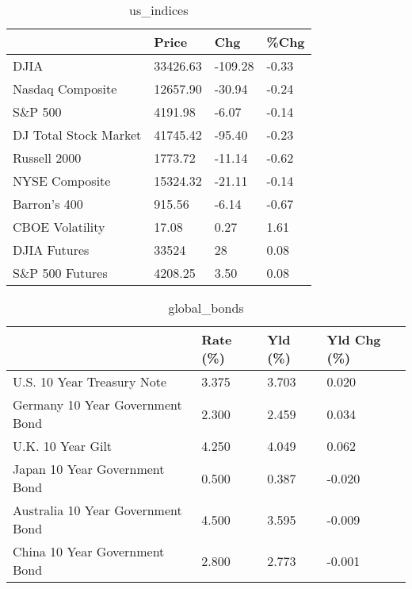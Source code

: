 \documentclass{article}%
\begin{document}
%


\begin{table}[htbp]%
\caption{us\_indices}%
\centering%
\begin{adjustbox}{width=1\textwidth}%
\begin{tabular}{llll}
\toprule
                      &    Price &     Chg &  \%Chg \\
\midrule
                 DJIA & 33426.63 & -109.28 & -0.33 \\
     Nasdaq Composite & 12657.90 &  -30.94 & -0.24 \\
              S\&P 500 &  4191.98 &   -6.07 & -0.14 \\
DJ Total Stock Market & 41745.42 &  -95.40 & -0.23 \\
         Russell 2000 &  1773.72 &  -11.14 & -0.62 \\
       NYSE Composite & 15324.32 &  -21.11 & -0.14 \\
         Barron's 400 &   915.56 &   -6.14 & -0.67 \\
      CBOE Volatility &    17.08 &    0.27 &  1.61 \\
         DJIA Futures &    33524 &      28 &  0.08 \\
      S\&P 500 Futures &  4208.25 &    3.50 &  0.08 \\
\bottomrule
\end{tabular}
%
\end{adjustbox}%
\end{table}

%


\begin{table}[htbp]%
\caption{global\_bonds}%
\centering%
\begin{adjustbox}{width=1\textwidth}%
\begin{tabular}{llll}
\toprule
                                  & Rate (\%) & Yld (\%) & Yld Chg (\%) \\
\midrule
       U.S. 10 Year Treasury Note &    3.375 &   3.703 &       0.020 \\
  Germany 10 Year Government Bond &    2.300 &   2.459 &       0.034 \\
                U.K. 10 Year Gilt &    4.250 &   4.049 &       0.062 \\
    Japan 10 Year Government Bond &    0.500 &   0.387 &      -0.020 \\
Australia 10 Year Government Bond &    4.500 &   3.595 &      -0.009 \\
    China 10 Year Government Bond &    2.800 &   2.773 &      -0.001 \\
\bottomrule
\end{tabular}
%
\end{adjustbox}%
\end{table}
\end{document}

